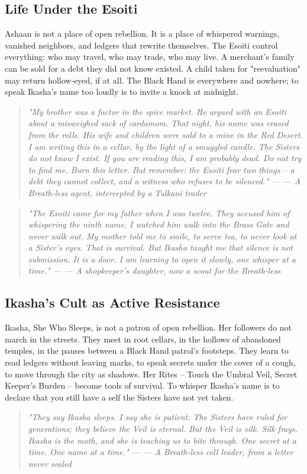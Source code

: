 \documentclass[11pt]{book}
\newcommand{\letter}[2]{\begin{quote}\small\itshape #1 \hfill --- #2\end{quote}}
\begin{document}
\subsection*{Life Under the Esoiti}
Ashaan is not a place of open rebellion. It is a place of whispered warnings, vanished neighbors, and ledgers that rewrite themselves. The Esoiti control everything: who may travel, who may trade, who may live. A merchant's family can be sold for a debt they did not know existed. A child taken for "reevaluation" may return hollow‑eyed, if at all. The Black Hand is everywhere and nowhere; to speak Ikasha's name too loudly is to invite a knock at midnight.

\letter{"My brother was a factor in the spice market. He argued with an Esoiti about a misweighed sack of cardamom. That night, his name was erased from the rolls. His wife and children were sold to a mine in the Red Desert. I am writing this in a cellar, by the light of a smuggled candle. The Sisters do not know I exist. If you are reading this, I am probably dead. Do not try to find me. Burn this letter. But remember: the Esoiti fear two things -- a debt they cannot collect, and a witness who refuses to be silenced."}{--- A Breath‑less agent, intercepted by a Tulkani trader}

\letter{"The Esoiti came for my father when I was twelve. They accused him of whispering the ninth name. I watched him walk into the Brass Gate and never walk out. My mother told me to smile, to serve tea, to never look at a Sister's eyes. That is survival. But Ikasha taught me that silence is not submission. It is a door. I am learning to open it slowly, one whisper at a time."}{--- A shopkeeper's daughter, now a scout for the Breath‑less}

\subsection*{Ikasha's Cult as Active Resistance}
Ikasha, She Who Sleeps, is not a patron of open rebellion. Her followers do not march in the streets. They meet in root cellars, in the hollows of abandoned temples, in the pauses between a Black Hand patrol's footsteps. They learn to read ledgers without leaving marks, to speak secrets under the cover of a cough, to move through the city as shadows. Her Rites -- Touch the Umbral Veil, Secret Keeper's Burden -- become tools of survival. To whisper Ikasha's name is to declare that you still have a self the Sisters have not yet taken.

\letter{"They say Ikasha sleeps. I say she is patient. The Sisters have ruled for generations; they believe the Veil is eternal. But the Veil is silk. Silk frays. Ikasha is the moth, and she is teaching us to bite through. One secret at a time. One name at a time."}{--- A Breath‑less cell leader, from a letter never sealed}
\end{document}
